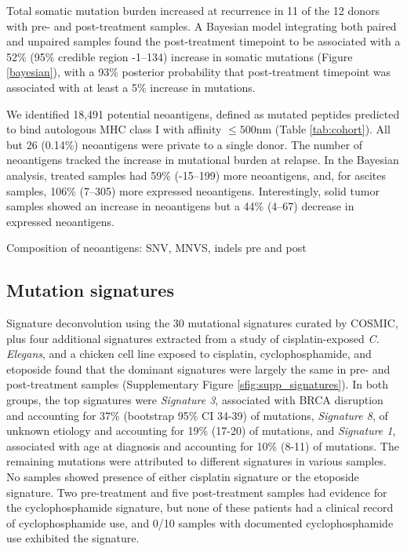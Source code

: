 Total somatic mutation burden increased at recurrence in 11 of the 12 donors with pre- and post-treatment samples. A Bayesian model integrating both paired and unpaired samples found the post-treatment timepoint to be associated with a 52\% (95\% credible region -1--134) increase in somatic mutations (Figure \ref{bayesian}), with a 93\% posterior probability that post-treatment timepoint was associated with at least a 5\% increase in mutations. 

We identified 18,491 potential neoantigens, defined as mutated peptides predicted to bind autologous MHC class I with affinity $\leq 500$nm (Table \ref{tab:cohort}). All but 26 (0.14\%) neoantigens were private to a single donor. The number of neoantigens tracked the increase in mutational burden at relapse. In the Bayesian analysis, treated samples had 59\% (-15--199) more neoantigens, and, for ascites samples, 106\% (7--305) more expressed neoantigens. Interestingly, solid tumor samples showed an increase in neoantigens but a 44\% (4--67) decrease in expressed neoantigens.

Composition of neoantigens: SNV, MNVS, indels pre and post


\subsection*{Mutation signatures}
Signature deconvolution using the 30 mutational signatures curated by COSMIC\cite{364242}, plus four additional signatures extracted from a study of cisplatin-exposed \textit{C. Elegans}\cite{Meier_2014}, and a chicken cell line exposed to cisplatin, cyclophosphamide, and etoposide\cite{Szikriszt_2016} found that the dominant signatures were largely the same in pre- and post-treatment samples (Supplementary Figure \ref{sfig:supp_signatures}). In both groups, the top signatures were \textit{Signature 3}, associated with BRCA disruption and accounting for 37\% (bootstrap 95\% CI 34-39) of mutations, \textit{Signature 8}, of unknown etiology and accounting for 19\% (17-20) of mutations, and \textit{Signature 1}, associated with age at diagnosis and accounting for 10\% (8-11) of mutations. The remaining mutations were attributed to different signatures in various samples. No samples showed presence of either cisplatin signature or the etoposide signature. Two pre-treatment and five post-treatment samples had evidence for the cyclophosphamide signature, but none of these patients had a clinical record of cyclophosphamide use, and 0/10 samples with documented cyclophosphamide use exhibited the signature.

